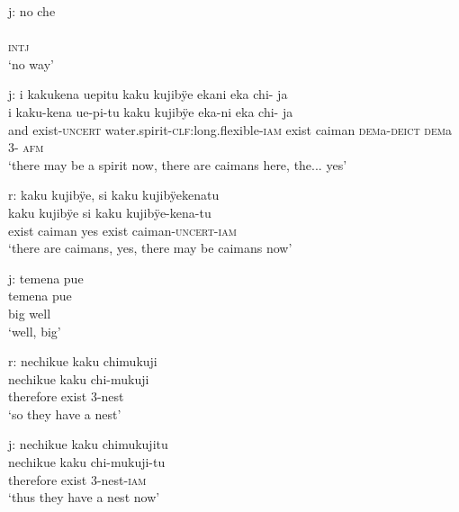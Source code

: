 \ea%
\begingl 
\glpreamble \textup{j:} no che\\
\\ 
\glb \textsc{intj}\\ 
\glft ‘no way’\\ 
\endgl
\xe


\ea%
\begingl 
\glpreamble \textup{j:} i kakukena uepitu kaku kujibÿe ekani eka chi- ja\\
\gla i kaku-kena ue-pi-tu kaku kujibÿe eka-ni eka chi- ja\\ 
\glb and exist-\textsc{uncert} water.spirit-\textsc{clf:}long.flexible-\textsc{iam} exist caiman \textsc{dem}a-\textsc{deict} \textsc{dem}a 3- \textsc{afm}\\ 
\glft ‘there may be a spirit now, there are caimans here, the... yes’\\ 
\endgl
\xe


\ea%
\begingl 
\glpreamble \textup{r:} kaku kujibÿe, si kaku kujibÿekenatu\\
\gla kaku kujibÿe si kaku kujibÿe-kena-tu\\ 
\glb exist caiman yes exist caiman-\textsc{uncert}-\textsc{iam}\\ 
\glft ‘there are caimans, yes, there may be caimans now’\\ 
\endgl
\xe

\ea%
\begingl 
\glpreamble \textup{j:} temena pue\\
\gla temena pue\\ 
\glb big well\\ 
\glft ‘well, big’\\ 
\endgl
\xe

\ea%
\begingl 
\glpreamble \textup{r:} nechikue kaku chimukuji\\
\gla nechikue kaku chi-mukuji\\ 
\glb therefore exist 3-nest\\ 
\glft ‘so they have a nest’\\ 
\endgl
\xe


\ea%
\begingl 
\glpreamble \textup{j:} nechikue kaku chimukujitu\\
\gla nechikue kaku chi-mukuji-tu\\ 
\glb therefore exist 3-nest-\textsc{iam}\\ 
\glft ‘thus they have a nest now’\\ 
\endgl
\xe

